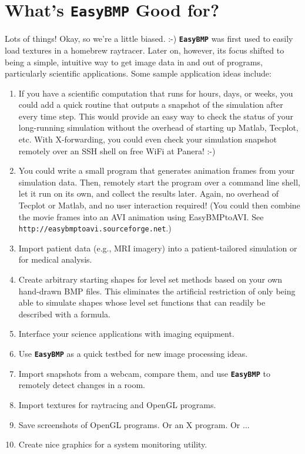 \documentclass[12pt]{article}
\newcommand{\EasyBMP}{\textbf{\texttt{{\color{DarkBlue}Easy}{\color{DarkRed}BMP}}}}
\begin{document}
\section{What's \EasyBMP{} Good for?}
Lots of things! Okay, so we're a little biased. :-) \EasyBMP{} was first 
used to easily load textures in a homebrew raytracer. Later on, however, 
its focus shifted to being a simple, intuitive way to get image 
data in and out of programs, particularly scientific applications. Some 
sample application ideas include:
\begin{enumerate}
\item %
If you have a scientific computation that runs for hours, days, or weeks, 
you could add a quick routine that outputs a snapshot of the simulation  
after every time step. This would provide an easy way to check 
the status of your long-running simulation without the overhead of 
starting up Matlab, Tecplot, etc. With X-forwarding, you could even 
check your simulation snapshot remotely over an SSH shell on free 
WiFi at Panera! :-) 
\item %
You could write a small program that generates animation frames from  
your simulation data. Then, remotely start the program over a command 
line shell, let it run on its own, and collect the results later. Again, no 
overhead of Tecplot or Matlab, and no user interaction required! 
(You could then combine the movie frames into an AVI animation using 
EasyBMPtoAVI. See \texttt{http://easybmptoavi.sourceforge.net}.) 
\item %
Import patient data (e.g., MRI imagery) into a 
patient-tailored simulation or for medical analysis. 
\item %
Create arbitrary starting shapes for level set methods 
based on your own hand-drawn BMP files. This eliminates the 
artificial restriction of only being able to simulate  
shapes whose level set functions that can readily be described 
with a formula. 
\item %
Interface your science applications with imaging equipment. 
\item %
Use \EasyBMP{} as a quick testbed for new image processing 
ideas.
\item %
Import snapshots from a webcam, compare them, and use \EasyBMP{} 
to remotely detect changes in a room.
\item %
Import textures for raytracing and OpenGL programs. 
\item %
Save screenshots of OpenGL programs. Or an X program. Or ... 
\item %
Create nice graphics for a system monitoring utility.
\end{enumerate}
\end{document}
